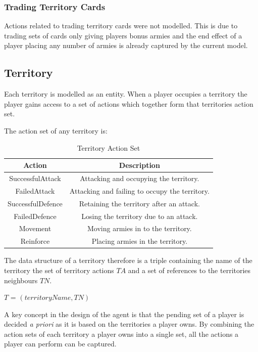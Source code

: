 \documentclass[parskip]{cs4rep}
\begin{document}
\subsubsection{Trading Territory Cards}

Actions related to trading territory cards were not modelled. This is due to trading sets of cards only giving players bonus armies and the end effect of a player placing any number of armies is already captured by the current model.

\subsection{Territory}

Each territory is modelled as an entity. When a player occupies a territory the player gains access to a set of actions which together form that territories action set.

The action set of any territory is:

\begin{table}[ht]
\centering
\begin{tabular}{|c|c|}
\hline 
\textbf{Action} & \textbf{Description} \\ 
\hline 
SuccessfulAttack & Attacking and occupying the territory.\\ 
\hline 
FailedAttack & Attacking and failing to occupy the territory.\\ 
\hline 
SuccessfulDefence & Retaining the territory after an attack.\\ 
\hline 
FailedDefence & Losing the territory due to an attack.\\
\hline
Movement & Moving armies in to the territory.\\
\hline  
Reinforce & Placing armies in the territory.\\
\hline 
\end{tabular}
\caption{Territory Action Set}
\label{table:territory-actions-bonus}
\end{table}

\newpage

The data structure of a territory therefore is a triple containing the name of the territory the set of territory actions $TA$ and a set of references to the territories neighbours $TN$.

\centerline{
$T$ = $( territoryName, TN )$
}

A key concept in the design of the agent is that the pending set of a player is decided \textit{a priori} as it is based on the territories a player owns. By combining the action sets of each territory a player owns into a single set, all the actions a player can perform can be captured.
\end{document}
